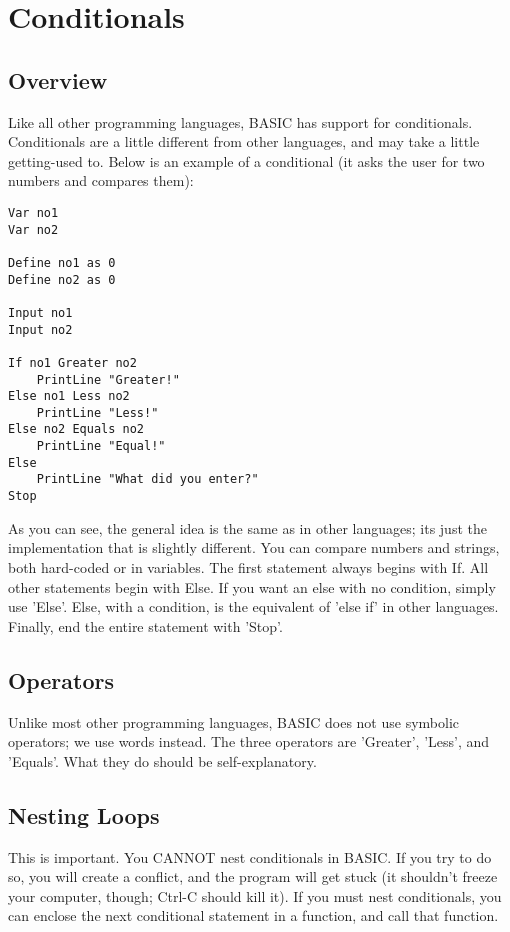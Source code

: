 \documentclass{report}
\begin{document}
\chapter{Conditionals}

\section{Overview}

Like all other programming languages, BASIC has support for conditionals. Conditionals are a little different from other languages, and may take a little getting-used to. Below is an example of a conditional (it asks the user for two numbers and compares them):

\begin{lstlisting}
Var no1
Var no2

Define no1 as 0
Define no2 as 0

Input no1
Input no2

If no1 Greater no2
	PrintLine "Greater!"
Else no1 Less no2
	PrintLine "Less!"
Else no2 Equals no2
	PrintLine "Equal!"
Else
	PrintLine "What did you enter?"
Stop
\end{lstlisting}

As you can see, the general idea is the same as in other languages; its just the implementation that is slightly different. You can compare numbers and strings, both hard-coded or in variables. The first statement always begins with If. All other statements begin with Else. If you want an else with no condition, simply use 'Else'. Else, with a condition, is the equivalent of 'else if' in other languages. Finally, end the entire statement with 'Stop'.

\section{Operators}

Unlike most other programming languages, BASIC does not use symbolic operators; we use words instead. The three operators are 'Greater', 'Less', and 'Equals'. What they do should be self-explanatory.

\section{Nesting Loops}

This is important. You CANNOT nest conditionals in BASIC. If you try to do so, you will create a conflict, and the program will get stuck (it shouldn't freeze your computer, though; Ctrl-C should kill it). If you must nest conditionals, you can enclose the next conditional statement in a function, and call that function.
\end{document}

